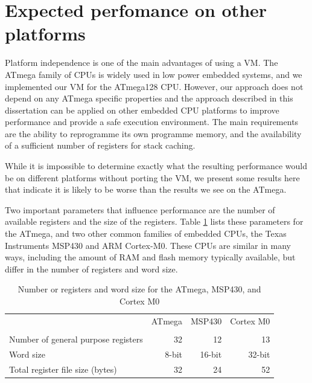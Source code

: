 \section{Expected perfomance on other platforms}
\label{sec-evaluation-other-platforms}
Platform independence is one of the main advantages of using a VM. The ATmega family of CPUs is widely used in low power embedded systems, and we implemented our VM for the ATmega128 CPU. However, our approach does not depend on any ATmega specific properties and the approach described in this dissertation can be applied on other embedded CPU platforms to improve performance and provide a safe execution environment. The main requirements are the ability to reprogramme its own programme memory, and the availability of a sufficient number of registers for stack caching.

While it is impossible to determine exactly what the resulting performance would be on different platforms without porting the VM, we present some results here that indicate it is likely to be worse than the results we see on the ATmega.

Two important parameters that influence performance are the number of available registers and the size of the registers. Table \ref{tbl-ATmega-msp430-m0-registers} lists these parameters for the ATmega, and two other common families of embedded CPUs, the Texas Instruments MSP430 and ARM Cortex-M0. These CPUs are similar in many ways, including the amount of RAM and flash memory typically available, but differ in the number of registers and word size.

\begin{table}
\caption{Number or registers and word size for the ATmega, MSP430, and Cortex M0}
\label{tbl-ATmega-msp430-m0-registers}
    \begin{tabular}{lrrr} %
    \toprule
                                           & ATmega       & MSP430     & Cortex M0 \\
                                           & \cite{Atmel:ATmega128Datasheet, Atmel:AVRInstructionSetManual}
                                           & \cite{TexasInstrumentsIncorporated:MSP430F1611Datasheet, TexasInstrumentsIncorporated:MSP430x1xxUsersGuide}
                                           & \cite{ARM:2009vz} \\
    \midrule
    \midrule
    Number of general purpose registers    & 32           & 12         & 13        \\
    Word size                              & 8-bit        & 16-bit     & 32-bit    \\
    Total register file size (bytes)       & 32           & 24         & 52        \\
    \bottomrule
    \end{tabular}
\end{table}


